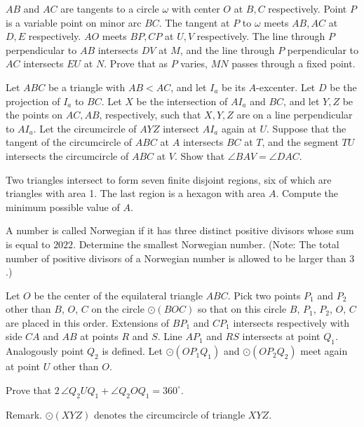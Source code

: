 \documentclass[11pt]{scrartcl}
\begin{document}
\begin{problem}[733773583946080]
$AB$ and $AC$ are tangents to a circle $\omega$ with center $O$ at $B,C$ respectively. Point $P$ is a variable point on minor arc $BC$. The tangent at $P$ to $\omega$ meets $AB,AC$ at $D,E$ respectively. $AO$ meets $BP,CP$ at $U,V$ respectively. The line through $P$ perpendicular to $AB$ intersects $DV$ at $M$, and the line through $P$ perpendicular to $AC$ intersects $EU$ at $N$. Prove that as $P$ varies, $MN$ passes through a fixed point.
\end{problem}
\begin{problem}[7017112574129036660]
	Let $ABC$ be a triangle with $AB<AC$, and let $I_a$ be its $A$-excenter. Let $D$ be the projection of $I_a$ to $BC$. Let $X$ be the intersection of $AI_a$ and $BC$, and let $Y,Z$ be the points on $AC,AB$, respectively, such that $X,Y,Z$ are on a line perpendicular to $AI_a$. Let the circumcircle of $AYZ$ intersect $AI_a$ again at $U$. Suppose that the tangent of the circumcircle of $ABC$ at $A$ intersects $BC$ at $T$, and the segment $TU$ intersects the circumcircle of $ABC$ at $V$. Show that $\angle BAV=\angle DAC$.
\end{problem}
\begin{problem}[1580707630770476037]
Two triangles intersect to form seven finite disjoint regions, six of which are triangles with area 1. The last region is a hexagon with area \(A\). Compute the minimum possible value of \(A\).
\end{problem}
\begin{problem}[660403976209529]
A number is called Norwegian if it has three distinct positive divisors whose sum is equal to $2022$. Determine the smallest Norwegian number.
(Note: The total number of positive divisors of a Norwegian number is allowed to be larger than $3$.)
\end{problem}
\begin{problem}[518384374486289]
	Let $O$ be the center of the equilateral triangle $ABC$. Pick two points $P_1$ and $P_2$ other than $B$, $O$, $C$ on the circle $\odot(BOC)$ so that on this circle $B$, $P_1$, $P_2$, $O$, $C$ are placed in this order. Extensions of $BP_1$ and $CP_1$ intersects respectively with side $CA$ and $AB$ at points $R$ and $S$. Line $AP_1$ and $RS$ intersects at point $Q_1$. Analogously point $Q_2$ is defined. Let $\odot(OP_1Q_1)$ and $\odot(OP_2Q_2)$ meet again at point $U$ other than $O$.

Prove that $2\,\angle Q_2UQ_1 + \angle Q_2OQ_1 = 360^\circ$.

Remark. $\odot(XYZ)$ denotes the circumcircle of triangle $XYZ$.
\end{problem}
\end{document}

